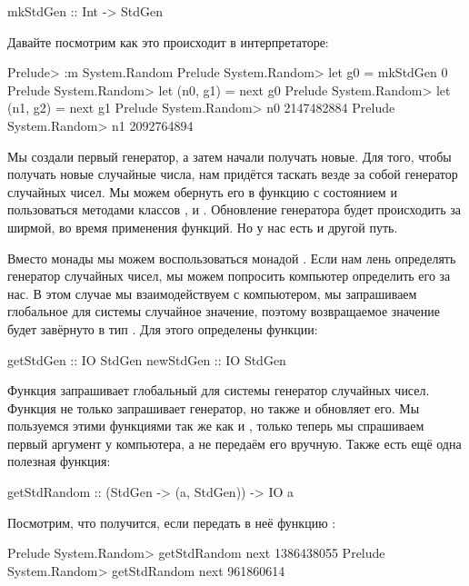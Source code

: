 \begin{code}
mkStdGen :: Int -> StdGen
\end{code}

Давайте посмотрим как это происходит в интерпретаторе:


\begin{code}
Prelude> :m System.Random
Prelude System.Random> let g0 = mkStdGen 0
Prelude System.Random> let (n0, g1) = next g0
Prelude System.Random> let (n1, g2) = next g1
Prelude System.Random> n0
2147482884
Prelude System.Random> n1
2092764894
\end{code}

Мы создали первый генератор, а затем начали получать новые. Для того,
чтобы получать новые случайные числа, нам придётся таскать везде за
собой генератор случайных чисел. Мы можем обернуть его в функцию с
состоянием и пользоваться методами классов ,
 и . Обновление генератора будет происходить
за ширмой, во время применения функций. Но у нас есть и другой путь.

Вместо монады  мы можем воспользоваться монадой . Если
нам лень определять генератор случайных чисел, мы можем попросить
компьютер определить его за нас. В этом случае мы взаимодействуем с
компьютером, мы запрашиваем глобальное для системы случайное значение,
поэтому возвращаемое значение будет завёрнуто в тип . Для этого
определены функции:


\begin{code}
getStdGen :: IO StdGen
newStdGen :: IO StdGen
\end{code}

Функция  запрашивает глобальный для системы генератор
случайных чисел. Функция  не только запрашивает генератор,
но также и обновляет его. Мы пользуемся этими функциями так же как и
, только теперь мы спрашиваем первый аргумент у компьютера,
а не передаём его вручную. Также есть ещё одна полезная функция:


\begin{code}
getStdRandom    :: (StdGen -> (a, StdGen)) -> IO a
\end{code}

Посмотрим, что получится, если передать в неё функцию :


\begin{code}
Prelude System.Random> getStdRandom next 
1386438055
Prelude System.Random> getStdRandom next 
961860614
\end{code}

